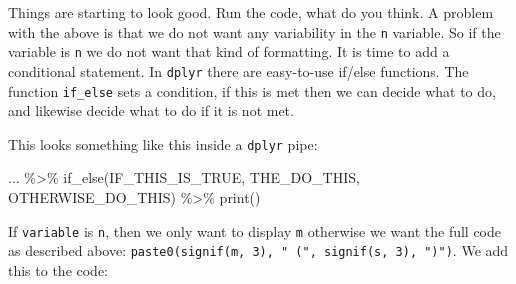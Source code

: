 \documentclass[
  11pt,
  letterpaper,
]{scrbook}
\newenvironment{Shaded}{\begin{snugshade}}{\end{snugshade}}
\newcommand{\FunctionTok}[1]{\textcolor[rgb]{0.28,0.35,0.67}{#1}}
\newcommand{\NormalTok}[1]{\textcolor[rgb]{0.00,0.23,0.31}{#1}}
\newcommand{\SpecialCharTok}[1]{\textcolor[rgb]{0.37,0.37,0.37}{#1}}
\begin{document}
Things are starting to look good. Run the code, what do you think. A
problem with the above is that we do not want any variability in the
\texttt{n} variable. So if the variable is \texttt{n} we do not want
that kind of formatting. It is time to add a conditional statement. In
\texttt{dplyr} there are easy-to-use if/else functions. The function
\texttt{if\_else} sets a condition, if this is met then we can decide
what to do, and likewise decide what to do if it is not met.

This looks something like this inside a \texttt{dplyr} pipe:

\begin{Shaded}
\begin{Highlighting}[numbers=left,,]
\NormalTok{... }\SpecialCharTok{\%\textgreater{}\%}
  \FunctionTok{if\_else}\NormalTok{(IF\_THIS\_IS\_TRUE, THE\_DO\_THIS, OTHERWISE\_DO\_THIS) }\SpecialCharTok{\%\textgreater{}\%}
  \FunctionTok{print}\NormalTok{()}
\end{Highlighting}
\end{Shaded}

If \texttt{variable} is \texttt{n}, then we only want to display
\texttt{m} otherwise we want the full code as described above:
\texttt{paste0(signif(m,\ 3),\ "\ (",\ signif(s,\ 3),\ ")")}. We add
this to the code:
\end{document}
